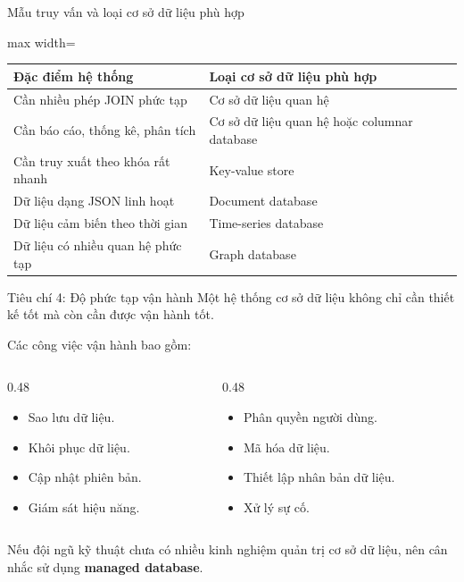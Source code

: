 \documentclass[aspectratio=169,11pt]{beamer}
\newcommand{\keyword}[1]{\textcolor{accent}{\textbf{#1}}}
\newcommand{\kw}[1]{\keyword{#1}}
\newcommand{\smallitem}{\setlength{\itemsep}{2pt}\setlength{\parskip}{0pt}}
\begin{document}
\begin{frame}{Mẫu truy vấn và loại cơ sở dữ liệu phù hợp}
\scriptsize
\begin{adjustbox}{max width=\textwidth}
\begin{tabularx}{\textwidth}{>{\raggedright\arraybackslash}p{}>{\raggedright\arraybackslash}X}
\toprule
\textbf{Đặc điểm hệ thống} & \textbf{Loại cơ sở dữ liệu phù hợp} \\
\midrule
Cần nhiều phép JOIN phức tạp & Cơ sở dữ liệu quan hệ \\
Cần báo cáo, thống kê, phân tích & Cơ sở dữ liệu quan hệ hoặc columnar database \\
Cần truy xuất theo khóa rất nhanh & Key-value store \\
Dữ liệu dạng JSON linh hoạt & Document database \\
Dữ liệu cảm biến theo thời gian & Time-series database \\
Dữ liệu có nhiều quan hệ phức tạp & Graph database \\
\bottomrule
\end{tabularx}
\end{adjustbox}
\end{frame}

\begin{frame}{Tiêu chí 4: Độ phức tạp vận hành}
Một hệ thống cơ sở dữ liệu không chỉ cần thiết kế tốt mà còn cần được vận hành tốt.

\vspace{2mm}
Các công việc vận hành bao gồm:
\begin{columns}[T]
\begin{column}{0.48\textwidth}
\begin{itemize}
  \smallitem
  \item Sao lưu dữ liệu.
  \item Khôi phục dữ liệu.
  \item Cập nhật phiên bản.
  \item Giám sát hiệu năng.
\end{itemize}
\end{column}
\begin{column}{0.48\textwidth}
\begin{itemize}
  \smallitem
  \item Phân quyền người dùng.
  \item Mã hóa dữ liệu.
  \item Thiết lập nhân bản dữ liệu.
  \item Xử lý sự cố.
\end{itemize}
\end{column}
\end{columns}

\vspace{1mm}
Nếu đội ngũ kỹ thuật chưa có nhiều kinh nghiệm quản trị cơ sở dữ liệu, nên cân nhắc sử dụng \kw{managed database}.
\end{frame}
\end{document}
